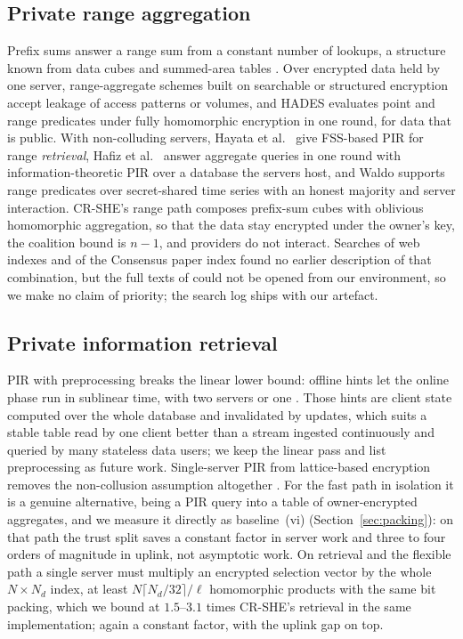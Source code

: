 \documentclass[a4paper,fleqn]{cas-sc}
\begin{document}
\subsection{Private range aggregation}
Prefix sums answer a range sum from a constant number of lookups, a structure
known from data cubes \citep{ho1997range} and summed-area tables
\citep{crow1984summed}. Over encrypted data held by one server, range-aggregate
schemes built on searchable or structured encryption
\citep{demertzis2018practical,espiritu2022arq} accept leakage of access
patterns or volumes, and HADES \citep{liu2025hades} evaluates point and range
predicates under fully homomorphic encryption in one round, for data that is
public. With non-colluding servers, Hayata et al.\ \citep{hayata2020private}
give FSS-based PIR for range \emph{retrieval}, Hafiz et
al.\ \citep{hafiz2024private} answer aggregate queries in one round with
information-theoretic PIR over a database the servers host, and Waldo
\citep{waldo} supports range predicates over secret-shared time series with an
honest majority and server interaction. CR-SHE's range path composes prefix-sum
cubes with oblivious homomorphic aggregation, so that the data stay encrypted
under the owner's key, the coalition bound is $n-1$, and providers do not
interact. Searches of web indexes and of the Consensus paper index found no
earlier description of that combination, but the full texts of
\citep{hafiz2024private,liu2025hades,espiritu2022arq,hayata2020private} could
not be opened from our environment, so we make no claim of priority; the search
log ships with our artefact.

\subsection{Private information retrieval}
PIR with preprocessing breaks the linear lower bound: offline hints let the
online phase run in sublinear time, with two servers
\citep{corrigan2020private} or one \citep{corrigan2022single,zhou2024piano}.
Those hints are client state computed over the whole database and invalidated
by updates, which suits a stable table read by one client better than a stream
ingested continuously and queried by many stateless data users; we keep the
linear pass and list preprocessing as future work. Single-server PIR from
lattice-based encryption
\citep{angel2018pir,mughees2021onionpir,menon2022spiral,davidson2023frodopir}
removes the non-collusion assumption altogether
\citep{kushilevitz1997replication}. For the fast path in isolation it is a
genuine alternative, being a PIR query into a table of owner-encrypted
aggregates, and we measure it directly as baseline~(vi)
(Section~\ref{sec:packing}): on that path the trust split saves a constant
factor in server work and three to four orders of magnitude in uplink, not
asymptotic work. On retrieval and the flexible path a single server must
multiply an encrypted selection vector by the whole $N\times N_d$ index, at
least $N\lceil N_d/32\rceil/\ell$ homomorphic products with the same bit
packing, which we bound at $1.5$--$3.1$ times CR-SHE's retrieval in the same
implementation; again a constant factor, with the uplink gap on top.
\end{document}
